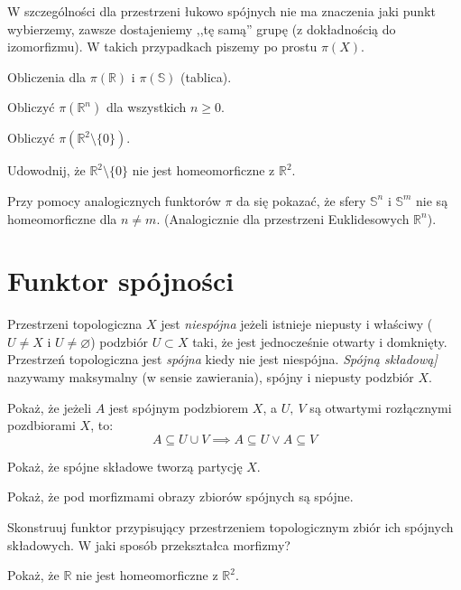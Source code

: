 \begin{remark}
	W szczególności dla przestrzeni łukowo spójnych nie ma znaczenia jaki punkt wybierzemy, zawsze dostajeniemy ,,tę samą'' grupę (z dokładnością do izomorfizmu).
	W takich przypadkach piszemy po prostu $\pi(X)$.
\end{remark}

\begin{example}
	Obliczenia dla $\pi(\mathbb{R})$ i $\pi(\mathbb{S})$ (tablica).
\end{example}

\begin{problem}
	Obliczyć $\pi(\mathbb R^n)$ dla wszystkich $n\ge 0$.
\end{problem}

\begin{problem}
	Obliczyć $\pi(\mathbb R^2\setminus \{0\})$.
\end{problem}

\begin{problem}
	Udowodnij, że $\mathbb{R}^2\setminus \{0\}$ nie jest homeomorficzne z $\mathbb{R}^2$.
\end{problem}

\begin{remark}
	Przy pomocy analogicznych funktorów $\pi$ da się pokazać, że sfery $\mathbb S^n$ i $\mathbb S^m$ nie są homeomorficzne dla $n\neq m$. (Analogicznie dla przestrzeni Euklidesowych $\mathbb R^n$).
\end{remark}

\section{Funktor spójności}

Przestrzeni topologiczna $X$ jest \emph{niespójna} jeżeli istnieje niepusty i właściwy ($U\neq X$ i $U\neq \varnothing$) podzbiór $U\subset X$ taki, że jest jednocześnie otwarty i domknięty. Przestrzeń topologiczna jest \emph{spójna} kiedy nie jest niespójna.
\emph{Spójną składową]} nazywamy maksymalny (w sensie zawierania), spójny i niepusty podzbiór $X$.

\begin{problem}
Pokaż, że jeżeli $A$ jest spójnym podzbiorem $X$, a $U,\ V$ są otwartymi rozłącznymi pozdbiorami $X$, to:
$$A \subseteq U\cup V \implies A \subseteq U \vee A \subseteq V$$
\end{problem}


\begin{problem}
	Pokaż, że spójne składowe tworzą partycję $X$.
\end{problem}

\begin{problem}
	Pokaż, że pod morfizmami obrazy zbiorów spójnych są spójne.
\end{problem}

\begin{problem}
	Skonstruuj funktor przypisujący przestrzeniem topologicznym zbiór ich spójnych składowych. W jaki sposób przekształca morfizmy?
\end{problem}

\begin{problem}
	Pokaż, że $\mathbb{R}$ nie jest homeomorficzne z $\mathbb{R}^2$.
\end{problem}
